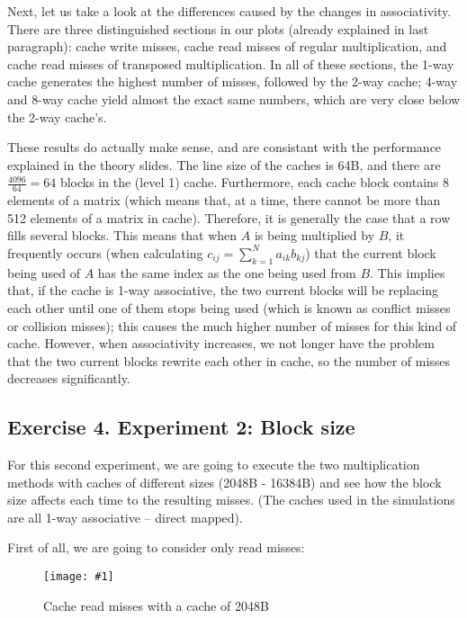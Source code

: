 \documentclass{article}
\newcommand{\myFigure}[4]{%
    \begin{figure}[!ht]
        \texttt{[image: \#1]}
        \centering
        \caption{#2}
        \label{#3}
    \end{figure}
}
\begin{document}
Next, let us take a look at the differences caused by the changes in associativity. There are three distinguished sections in our plots (already explained in last paragraph): cache write misses, cache read misses of regular multiplication, and cache read misses of transposed multiplication. In all of these sections, the 1-way cache generates the highest number of misses, followed by the 2-way cache; 4-way and 8-way cache yield almost the exact same numbers, which are very close below the 2-way cache's. 

These results do actually make sense, and are consistant with the performance explained in the theory slides. The line size of the caches is 64B, and there are $\frac{4096}{64}=64$ blocks in the (level 1) cache. 
Furthermore, each cache block contains 8 elements of a matrix (which means that, at a time, there cannot be more than 512 elements of a matrix in cache). Therefore, it is generally the case that a row fills several blocks.
This means that when $A$ is being multiplied by $B$, it frequently occurs (when calculating $c_{ij}=\sum_{k=1}^N a_{ik}b_{kj}$) that the current block being used of $A$ has the same index as the one being used from $B$. This implies that, if the cache is 1-way associative, the two current blocks will be replacing each other until one of them stops being used (which is known as conflict misses or collision misses); this causes the much higher number of misses for this kind of cache. However, when associativity increases, we not longer have the problem that the two current blocks rewrite each other in cache, so the number of misses decreases significantly.


\subsection*{Exercise 4. Experiment 2: Block size}


For this second experiment, we are going to execute the two multiplication methods with caches of different sizes (2048B - 16384B) and see how the block size affects each time to the resulting misses. (The caches used in the simulations are all 1-way associative -- direct mapped).

First of all, we are going to consider only read misses:


\myFigure{../material_P3/protect_out4/BlockSize_2048/cache_lectura.png}{Cache read misses with a cache of 2048B}{block_2048_lec}{0.52}
\end{document}
